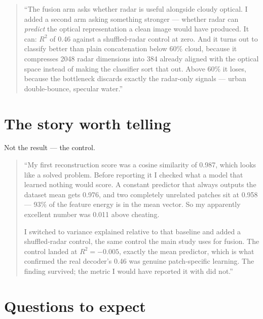 \documentclass[11pt,a4paper]{report}
\begin{document}
\begin{quote}
``The fusion arm asks whether radar is useful alongside cloudy optical. I added a
second arm asking something stronger --- whether radar can \emph{predict} the
optical representation a clean image would have produced. It can: $R^2$ of 0.46
against a shuffled-radar control at zero. And it turns out to classify better
than plain concatenation below 60\% cloud, because it compresses 2048 radar
dimensions into 384 already aligned with the optical space instead of making the
classifier sort that out. Above 60\% it loses, because the bottleneck discards
exactly the radar-only signals --- urban double-bounce, specular water.''
\end{quote}

\section{The story worth telling}

Not the result --- the control.

\begin{quote}
``My first reconstruction score was a cosine similarity of 0.987, which looks
like a solved problem. Before reporting it I checked what a model that learned
nothing would score. A constant predictor that always outputs the dataset mean
gets 0.976, and two completely unrelated patches sit at 0.958 --- 93\% of the
feature energy is in the mean vector. So my apparently excellent number was
0.011 above cheating.

\smallskip
I switched to variance explained relative to that baseline and added a
shuffled-radar control, the same control the main study uses for fusion. The
control landed at $R^2 = -0.005$, exactly the mean predictor, which is what
confirmed the real decoder's 0.46 was genuine patch-specific learning. The
finding survived; the metric I would have reported it with did not.''
\end{quote}

\section{Questions to expect}
\end{document}
